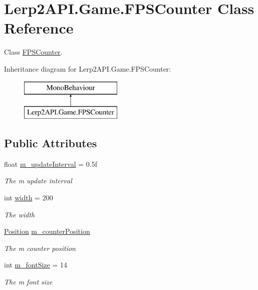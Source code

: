 \hypertarget{class_lerp2_a_p_i_1_1_game_1_1_f_p_s_counter}{}\section{Lerp2\+A\+P\+I.\+Game.\+F\+P\+S\+Counter Class Reference}
\label{class_lerp2_a_p_i_1_1_game_1_1_f_p_s_counter}


Class \hyperlink{class_lerp2_a_p_i_1_1_game_1_1_f_p_s_counter}{F\+P\+S\+Counter}.  


Inheritance diagram for Lerp2\+A\+P\+I.\+Game.\+F\+P\+S\+Counter\+:\begin{figure}[H]
\begin{center}
\leavevmode
\includegraphics[height=2.000000cm]{class_lerp2_a_p_i_1_1_game_1_1_f_p_s_counter}
\end{center}
\end{figure}
\subsection*{Public Attributes}
\begin{DoxyCompactItemize}
\item 
float \hyperlink{class_lerp2_a_p_i_1_1_game_1_1_f_p_s_counter_af56f602b2a2d60d61598b4f99037071d}{m\+\_\+update\+Interval} = 0.\+5f
\begin{DoxyCompactList}\small\item\em The m update interval \end{DoxyCompactList}\item 
int \hyperlink{class_lerp2_a_p_i_1_1_game_1_1_f_p_s_counter_a3c4912e96145faa7da3def885d1e228a}{width} = 200
\begin{DoxyCompactList}\small\item\em The width \end{DoxyCompactList}\item 
\hyperlink{namespace_lerp2_a_p_i_a5b0f263f740f1f4c8b67cf0c011dd90d}{Position} \hyperlink{class_lerp2_a_p_i_1_1_game_1_1_f_p_s_counter_a025577891ecddb9022e29fd461b5abec}{m\+\_\+counter\+Position}
\begin{DoxyCompactList}\small\item\em The m counter position \end{DoxyCompactList}\item 
int \hyperlink{class_lerp2_a_p_i_1_1_game_1_1_f_p_s_counter_a639d33c87a08a7b78b6bc913dcf44b47}{m\+\_\+font\+Size} = 14
\begin{DoxyCompactList}\small\item\em The m font size \end{DoxyCompactList}\end{DoxyCompactItemize}
